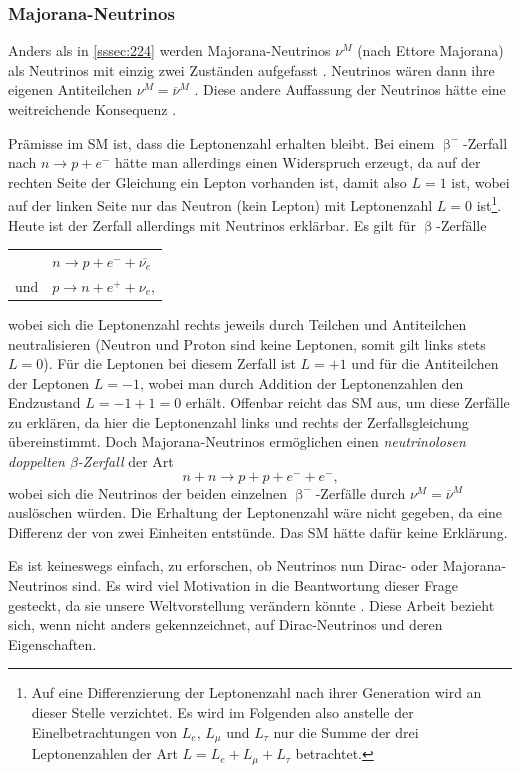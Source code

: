 \documentclass[a4paper,12pt]{article}
\begin{document}
\subsubsection{Majorana-Neutrinos} \label{sssec:225}
Anders als in \cref{sssec:224} werden Majorana-Neutrinos $\nu^M$ (nach Ettore Majorana) als Neutrinos mit einzig zwei Zuständen aufgefasst \cite[24]{Athar2020}. Neutrinos wären dann ihre eigenen Antiteilchen $\nu^M=\overline{\nu}^M$ \cite[286]{Zyla2020}. Diese andere Auffassung der Neutrinos hätte eine weitreichende Konsequenz \cite[25]{Athar2020}. \par
Prämisse im SM ist, dass die Leptonenzahl erhalten bleibt. Bei einem $\upbeta^-$-Zerfall nach $n \rightarrow p + e^-$ hätte man allerdings einen Widerspruch erzeugt, da auf der rechten Seite der Gleichung ein Lepton vorhanden ist, damit also $L=1$ ist, wobei auf der linken Seite nur das Neutron (kein Lepton) mit Leptonenzahl $L=0$ ist\footnote{Auf eine Differenzierung der Leptonenzahl nach ihrer Generation wird an dieser Stelle verzichtet. Es wird im Folgenden also anstelle der Einelbetrachtungen von $L_e$, $L_\mu$ und $L_\tau$ nur die Summe der drei Leptonenzahlen der Art $L=L_e+L_\mu+L_\tau$ betrachtet.}. Heute ist der Zerfall allerdings mit Neutrinos erklärbar. Es gilt für $\upbeta$-Zerfälle
\begin{table}[H]
\begin{tabularx}{\textwidth}{p{1.0cm} X}
 & $n \rightarrow p + e^- + \overline{\nu_{e}}$ \\
 und & $p \rightarrow n + e^+ + \nu_{e}$,
\end{tabularx}
\end{table}  
wobei sich die Leptonenzahl rechts jeweils durch Teilchen und Antiteilchen neutralisieren (Neutron und Proton sind keine Leptonen, somit gilt links stets $L=0$). Für die Leptonen bei diesem Zerfall ist $L=+1$ und für die Antiteilchen der Leptonen $L=-1$, wobei man durch Addition der Leptonenzahlen den Endzustand $L=-1+1=0$ erhält. Offenbar reicht das SM aus, um diese Zerfälle zu erklären, da hier die Leptonenzahl links und rechts der Zerfallsgleichung übereinstimmt. Doch Majorana-Neutrinos ermöglichen einen \emph{neutrinolosen doppelten $\beta$-Zerfall} der Art
\begin{equation}
n + n \rightarrow p + p + e^- + e^- \text{,}
\end{equation}
wobei sich die Neutrinos der beiden einzelnen $\upbeta^-$-Zerfälle durch $\nu^M = \overline{\nu}^M$ auslöschen würden. Die Erhaltung der Leptonenzahl wäre nicht gegeben, da eine Differenz der von zwei Einheiten entstünde. Das SM hätte dafür keine Erklärung. \par
Es ist keineswegs einfach, zu erforschen, ob Neutrinos nun Dirac- oder Majorana-Neutrinos sind. Es wird viel Motivation in die Beantwortung dieser Frage gesteckt, da sie unsere Weltvorstellung verändern könnte \cite{Cirigliano2022}\cite{Balantekin2019}. Diese Arbeit bezieht sich, wenn nicht anders gekennzeichnet, auf Dirac-Neutrinos und deren Eigenschaften. \par
\end{document}
